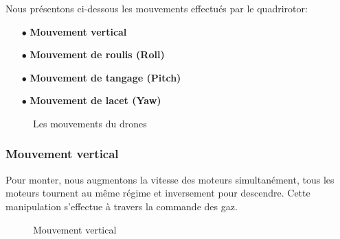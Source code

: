Nous présentons ci-dessous les mouvements effectués par le quadrirotor:		
\begin{itemize}
\item[$\bullet$] \textbf{Mouvement vertical}
\item[$\bullet$] \textbf{Mouvement de roulis (Roll)} 
\item[$\bullet$] \textbf{Mouvement de tangage (Pitch)}
\item[$\bullet$] \textbf {Mouvement de lacet (Yaw)}
\end{itemize}
\begin{figure} [H]
\begin{center}
	\centering
\end{center}
\caption{Les mouvements du drones}
\end{figure}


\subsubsection{Mouvement vertical}
Pour monter, nous augmentons la vitesse des moteurs simultanément, tous les moteurs tournent au même régime et inversement pour descendre. Cette manipulation s'effectue à travers la commande des gaz.
\begin{figure} [H]
\begin{center}
	\centering
\end{center}
\caption{Mouvement vertical}
\end{figure}


